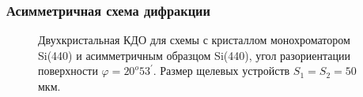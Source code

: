   \subsubsection{Асимметричная схема дифракции}


  \begin{figure}[H]
    \centering
    \hfill
    \caption{Двухкристальная КДО для схемы с кристаллом монохроматором Si(440) и асимметричным образцом Si(440),
    угол разориентации поверхности $\varphi = 20^o53^{'}$. Размер щелевых устройств $S_1 = S_2 = 50$ мкм.}
    \label{ris:assymetric_exp_50}
  \end{figure}
